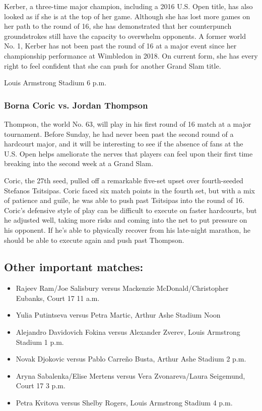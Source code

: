 Kerber, a three-time major champion, including a 2016 U.S. Open title,
has also looked as if she is at the top of her game. Although she has
lost more games on her path to the round of 16, she has demonstrated
that her counterpunch groundstrokes still have the capacity to overwhelm
opponents. A former world No. 1, Kerber has not been past the round of
16 at a major event since her championship performance at Wimbledon in
2018. On current form, she has every right to feel confident that she
can push for another Grand Slam title.

Louis Armstrong Stadium \textbar{} 6 p.m.

\hypertarget{borna-coric-vs-jordan-thompson}{%
\subsubsection{\texorpdfstring{\textbf{Borna Coric vs. Jordan
Thompson}}{Borna Coric vs. Jordan Thompson}}\label{borna-coric-vs-jordan-thompson}}

Thompson, the world No. 63, will play in his first round of 16 match at
a major tournament. Before Sunday, he had never been past the second
round of a hardcourt major, and it will be interesting to see if the
absence of fans at the U.S. Open helps ameliorate the nerves that
players can feel upon their first time breaking into the second week at
a Grand Slam.

Coric, the 27th seed, pulled off a remarkable five-set upset over
fourth-seeded Stefanos Tsitsipas. Coric faced six match points in the
fourth set, but with a mix of patience and guile, he was able to push
past Tsitsipas into the round of 16. Coric's defensive style of play can
be difficult to execute on faster hardcourts, but he adjusted well,
taking more risks and coming into the net to put pressure on his
opponent. If he's able to physically recover from his late-night
marathon, he should be able to execute again and push past Thompson.

\hypertarget{other-important-matches}{%
\subsection{Other important matches:}\label{other-important-matches}}

\begin{itemize}
\item
  Rajeev Ram/Joe Salisbury versus Mackenzie McDonald/Christopher
  Eubanks, Court 17 \textbar{} 11 a.m.
\item
  Yulia Putintseva versus Petra Martic, Arthur Ashe Stadium \textbar{}
  Noon
\item
  Alejandro Davidovich Fokina versus Alexander Zverev, Louis Armstrong
  Stadium \textbar{} 1 p.m.
\item
  Novak Djokovic versus Pablo Carreño Busta, Arthur Ashe Stadium
  \textbar{} 2 p.m.
\item
  Aryna Sabalenka/Elise Mertens versus Vera Zvonareva/Laura Seigemund,
  Court 17 \textbar{} 3 p.m.
\item
  Petra Kvitova versus Shelby Rogers, Louis Armstrong Stadium \textbar{}
  4 p.m.
\end{itemize}

